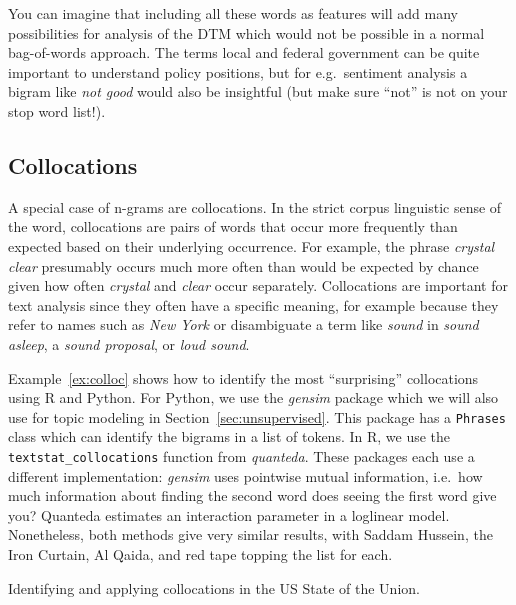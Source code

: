 You can imagine that including all these words as features will add many possibilities for analysis of the DTM
which would not be possible in a normal bag-of-words approach.
The terms local and federal government can be quite important to understand policy positions,
but for e.g.\ sentiment analysis a bigram like \emph{not good} would also be insightful
(but make sure ``not'' is not on your stop word list!).

\subsection{Collocations}

A special case of n-grams are collocations.
In the strict corpus linguistic sense of the word, collocations are pairs of words that occur more frequently than expected
based on their underlying occurrence.
For example, the phrase \emph{crystal clear} presumably occurs much more often than would be expected by chance given
how often \emph{crystal} and \emph{clear} occur separately.
Collocations are important for text analysis since they often have a specific meaning,
for example because they refer to names such as \emph{New York} or disambiguate a term like \emph{sound} in \emph{sound asleep},
a \emph{sound proposal}, or \emph{loud sound}.

Example~\ref{ex:colloc} shows how to identify the most ``surprising'' collocations using R and Python.
For Python, we use the \emph{gensim} package which we will also use for topic modeling in Section~\ref{sec:unsupervised}.
This package has a \texttt{Phrases} class which can identify the bigrams in a list of tokens.
In R, we use the \texttt{textstat\_collocations} function from \emph{quanteda}.
These packages each use a different implementation: \emph{gensim} uses pointwise mutual information, i.e.\
how much information about finding the second word does seeing the first word give you?
Quanteda estimates an interaction parameter in a loglinear model.
Nonetheless, both methods give very similar results, with Saddam Hussein, the Iron Curtain, Al Qaida, and red tape topping the list for each.


\begin{ccsexample}
\caption{Identifying and applying collocations in the US State of the Union.}\label{ex:colloc}
\end{ccsexample}


